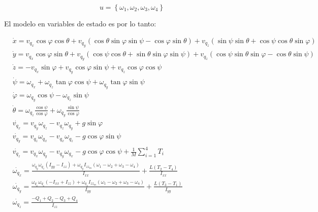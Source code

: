 \documentclass[main]{subfiles}
\begin{document}
$$u=\left\lbrace\omega_1, \omega_2, \omega_3, \omega_4\right\rbrace$$

El modelo en variables de estado es por lo tanto:

\begin{equation}
\boxed{\begin{aligned}&\dot{x}=v_{q_x} \cos \varphi \cos \theta + v_{q_y} ( \cos \theta \sin \varphi \sin \psi-\cos \varphi \sin \theta ) + v_{q_z}(\sin \psi \sin \theta + \cos \psi \cos \theta \sin \varphi)\\
&\dot{y}=v_{q_x} \cos \varphi \sin \theta + v_{q_y} (\cos \psi \cos \theta + \sin \theta \sin \varphi \sin \psi) + v_{q_z}( \cos \psi \sin \theta \sin \varphi-\cos \theta \sin \psi )\\
&\dot{z}= -v_{q_x} \sin \varphi  + v_{q_y} \cos \varphi \sin \psi  + v_{q_z}\cos \varphi \cos \psi\\
&\dot{\psi}=\omega_{q_x} + \omega_{q_z}\tan\varphi \cos\psi + \omega_{q_y}\tan\varphi \sin\psi\\
&\dot{\varphi}=\omega_{q_y}\cos \psi - \omega_{q_z}\sin\psi\\
&\dot{\theta}=\omega_{q_z} \frac{\cos\psi}{\cos\varphi}  + \omega_{q_y}\frac{\sin\psi}{\cos\varphi}\\
&\dot{v_{q_x}}=v_{q_y} \omega_{q_z} - v_{q_z} \omega_{q_y}+g\sin\varphi\\
&\dot{v_{q_y}}=v_{q_z} \omega_{q_x} - v_{q_x} \omega_{q_z}-g\cos\varphi\sin\psi\\
&\dot{v_{q_z}}=v_{q_x} \omega_{q_y} - v_{q_y} \omega_{q_x}-g\cos\varphi\cos\psi+\frac{1}{M}\sum_{i=1}^4T_i\\
&\dot{\omega_{q_x}}=\frac{\omega_{q_y}\omega_{q_z}(I_{yy}-I_{zz})+\omega_{q_y}I_{zz_m}(\omega_1-\omega_2+\omega_3-\omega_4)}{I_{xx}}+\frac{L(T_2-T_4)}{I_{xx}}\\
&\dot{\omega_{q_y}}=\frac{\omega_{q_x}\omega_{q_z}(-I_{xx}+I_{zz})+\omega_{q_x}I_{zz_m}(\omega_1-\omega_2+\omega_3-\omega_4)}{{I_{yy}}}+\frac{L(T_3-T_1)}{I_{yy}}\\
&\dot{\omega_{q_z}}=\frac{-Q_1+Q_2-Q_3+Q_4}{I_{zz}}\\
\end{aligned}}
\label{eq:modelo}
\end{equation}
\end{document}
